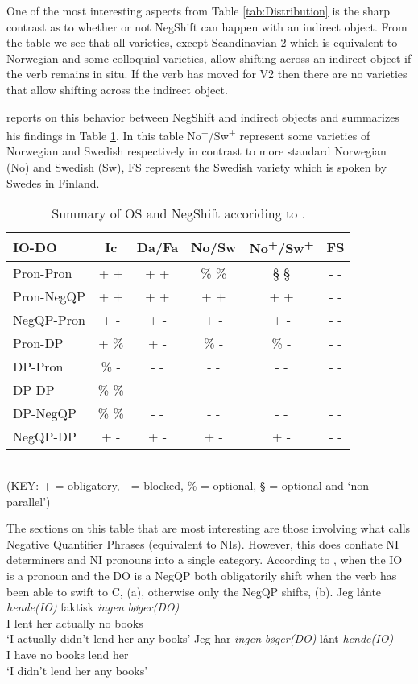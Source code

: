 \documentclass[12pt, letterpaper]{article}
\begin{document}
One of the most interesting aspects from Table \ref{tab:Distribution} is the sharp contrast as to whether or not NegShift can happen with an indirect object. From the table we see that all varieties, except Scandinavian 2 which is equivalent to Norwegian and some colloquial varieties, allow shifting across an indirect object if the verb remains in situ. If the verb has moved for V2 then there are no varieties that allow shifting across the indirect object.

\citet{christensenInterfacesNegationSyntax2005} reports on this behavior between NegShift and indirect objects and summarizes his findings in Table \ref{tab:OSNEGS}. In this table No\textsuperscript{+}/Sw\textsuperscript{+} represent some varieties of Norwegian and Swedish respectively in contrast to more standard Norwegian (No) and Swedish (Sw), FS represent the Swedish variety which is spoken by Swedes in Finland.
\begin{table}[h!]
\centering
\caption{Summary of OS and NegShift accoriding to \citet{christensenInterfacesNegationSyntax2005}.}
\label{tab:OSNEGS}
\begin{tabular}{lccccc}
\hline
IO-DO & Ic & Da/Fa & No/Sw & No\textsuperscript{+}/Sw\textsuperscript{+} & FS  \\
\hline 
Pron-Pron	&	+ +	&	+ +	&	\% \%	&	§ §	&	- -	\\
Pron-NegQP	&	+ +	&	+ +	&	+ +	&	+ +	&	- -	\\
NegQP-Pron	&	+ -	&	+ -	&	+ -	&	+ -	&	- -	\\
Pron-DP	&	+ \%	&	+ -	&	\% -	&	\% -	&	- -	\\
DP-Pron	&	\% -	&	- -	&	- -	&	- -	&	- -	\\
DP-DP	&	\% \%	&	- -	&	- -	&	- -	&	- -	\\
DP-NegQP	&	\% \%	&	- -	&	- -	&	- -	&	- -	\\
NegQP-DP	&	+ -	&	+ -	&	+ -	&	+ -	&	- -	\\
\hline 
\end{tabular}\\
(KEY: + = obligatory, - = blocked, \% = optional, § = optional and `non-parallel’)
\end{table}

The sections on this table that are most interesting are those involving what \citeauthor{christensenInterfacesNegationSyntax2005} calls Negative Quantifier Phrases (equivalent to NIs). However, this does conflate NI determiners and NI pronouns into a single category. According to \citeauthor{christensenInterfacesNegationSyntax2005}, when the IO is a pronoun and the DO is a NegQP both obligatorily shift when the verb has been able to swift to C, (a), otherwise only the NegQP shifts, (b).
	\ea 
		\ea 
		\gll Jeg lånte \textit{hende(IO)} faktisk \textit{ingen} \textit{bøger(DO)}\\
		I lent her actually no books\\
		\glt `I actually didn't lend her any books'
		\ex 
		\gll Jeg har \textit{ingen} \textit{bøger(DO)} lånt \textit{hende(IO)}\\
		I have no books lend her\\
		\glt `I didn't lend her any books'
		\z 
	\z 
\end{document}
